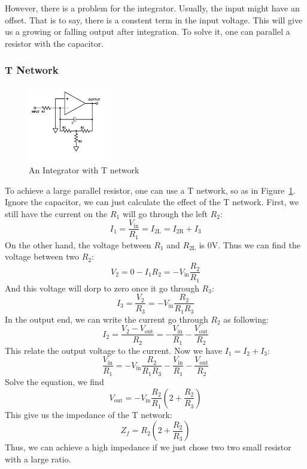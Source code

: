 \documentclass[aps,prl,reprint]{revtex4-1}
\begin{document}
        However, there is a problem for the integrator. Usually, the input might have an offset. That is to say, there is a constent term in the input voltage. This will give us a growing or falling output after integration. To solve it, one can parallel a resistor with the capacitor.
        \subsubsection{T Network}
            \begin{figure}[h]
                \centering
                \includegraphics[height=1.3in]{image/T-network.pdf}
                \caption{An Integrator with T network}
                \label{fig:tNetwork}
            \end{figure}{}
            To achieve a large parallel resistor, one can use a T network, so as in Figure~\ref{fig:tNetwork}. Ignore the capacitor, we can just calculate the effect of the T network. First, we still have the current on the $R_1$ will go through the left $R_2$:
            \[
            I_1 = \frac{V_\text{in}}{R_1} = I_\text{2L} = I_\text{2R} + I_3
            \]
            On the other hand, the voltage between $R_1$ and $R_\text{2L}$ is 0V. Thus we can find the voltage between two $R_2$:
            \[
            V_2 = 0 - I_1 R_2 = - V_\text{in} \frac{R_2}{R_1}
            \]
            And this voltage will dorp to zero once it go through $R_3$:
            \[
            I_3 = \frac{V_2}{R_3} = - V_\text{in} \frac{R_2}{R_1 R_3}
            \]
            In the output end, we can write the current go through $R_2$ as following:
            \[
            I_2 = \frac{V_2 - V_\text{out}}{R_2} = -\frac{V_\text{in}}{R_1} - \frac{V_\text{out}}{R_2}
            \]
            This relate the output voltage to the current. Now we have $I_1 = I_2 + I_3$:
            \[
            \frac{V_\text{in}}{R_1} =  - V_\text{in} \frac{R_2}{R_1 R_3} -\frac{V_\text{in}}{R_1} - \frac{V_\text{out}}{R_2}
            \]
            Solve the equation, we find
            \[
            V_\text{out} = - V_\text{in} \frac{R_2}{R_1} (2 + \frac{R_2}{R_3})
            \]
            This give us the impedance of the T network:
            \[
            Z_f = R_2(2 + \frac{R_2}{R_3})
            \]
            Thus, we can achieve a high impedance if we just chose two two small resistor with a large ratio.
\end{document}
